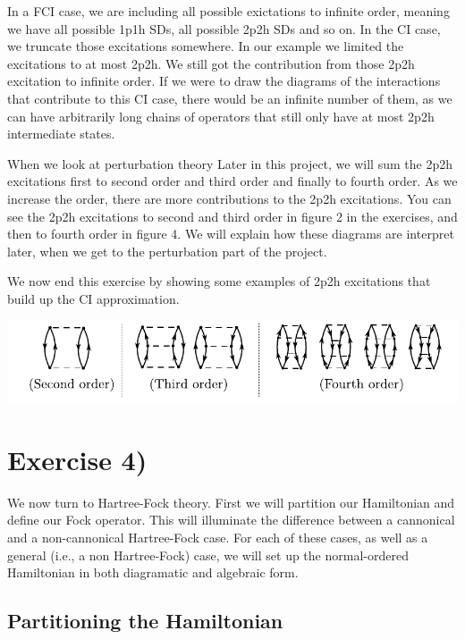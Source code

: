 \documentclass[a4paper, 11pt, notitlepage, english]{article}
\begin{document}
In a FCI case, we are including all possible exictations to infinite order, meaning we have all possible 1p1h SDs, all possible 2p2h SDs and so on. In the CI case, we truncate those excitations somewhere. In our example we limited the excitations to at most 2p2h. We still got the contribution from those 2p2h excitation to infinite order. If we were to draw the diagrams of the interactions that contribute to this CI case, there would be an infinite number of them, as we can have arbitrarily long chains of operators that still only have at most 2p2h intermediate states. 

When we look at perturbation theory Later in this project, we will sum the 2p2h excitations first to second order and third order and finally to fourth order. As we increase the order, there are more contributions to the 2p2h excitations. You can see the 2p2h excitations to second and third order in figure 2 in the exercises, and then to fourth order in figure 4. We will explain how these diagrams are interpret later, when we get to the perturbation part of the project. 

We now end this exercise by showing some examples of 2p2h excitations that build up the CI approximation.

\vspace{0.2cm}

\includegraphics[width=\textwidth]{project2_3}


\clearpage

\section*{Exercise 4)}

We now turn to Hartree-Fock theory. First we will partition our Hamiltonian and define our Fock operator. This will illuminate the difference between a cannonical and a non-cannonical Hartree-Fock case. For each of these cases, as well as a general (i.e., a non Hartree-Fock) case, we will set up the normal-ordered Hamiltonian in both diagramatic and algebraic form.


\subsection*{Partitioning the Hamiltonian}
\end{document}

